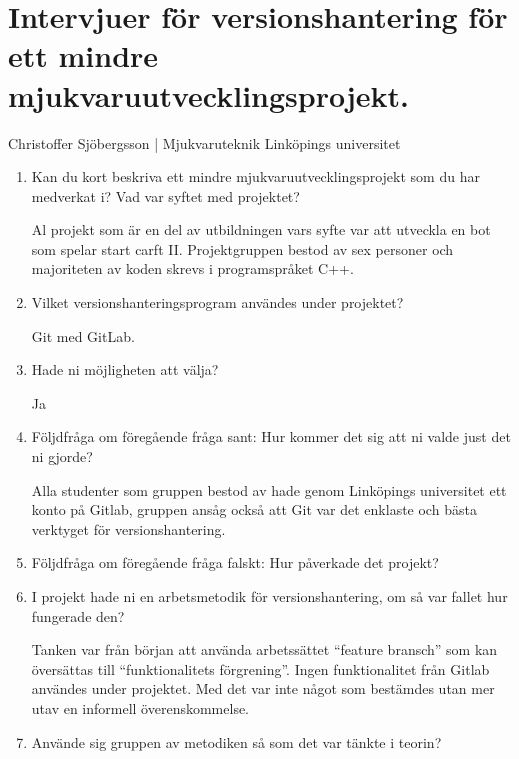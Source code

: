 \chapter{Intervjuer för versionshantering för ett mindre mjukvaruutvecklingsprojekt.}






\vspace{3em}
\begin{center}
    Christoffer Sjöbergsson | Mjukvaruteknik Linköpings universitet
\end{center}

\begin{enumerate}
    \item Kan du kort beskriva ett mindre mjukvaruutvecklingsprojekt som du har medverkat i? Vad var syftet med projektet?


    Al projekt som är en del av utbildningen vars syfte var att utveckla en bot som spelar start carft II. Projektgruppen bestod av sex personer och majoriteten av koden skrevs i programspråket C++.


    \item Vilket versionshanteringsprogram användes under projektet?

    Git med GitLab.

    \item Hade ni möjligheten att välja?

    Ja

    \item Följdfråga om föregående fråga sant: Hur kommer det sig att ni valde just det ni gjorde?

    Alla studenter som gruppen bestod av hade genom Linköpings universitet ett konto på Gitlab, gruppen ansåg också att Git var det enklaste och bästa verktyget för versionshantering.

    \item Följdfråga om föregående fråga falskt: Hur påverkade det projekt?

    \item I projekt hade ni en arbetsmetodik för versionshantering, om så var fallet hur fungerade den?

    Tanken var från början att använda arbetssättet ``feature bransch'' som kan översättas till ``funktionalitets förgrening''. Ingen funktionalitet från Gitlab användes under projektet. Med det var inte något som bestämdes utan mer utav en informell överenskommelse.

    \item Använde sig gruppen av metodiken så som det var tänkte i teorin?


\end{enumerate}
